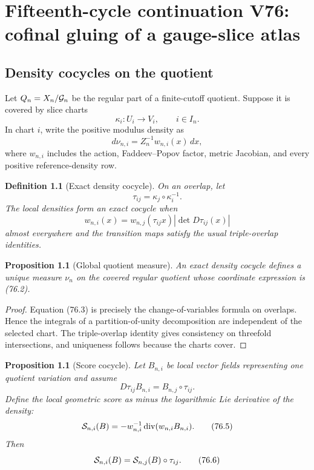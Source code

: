 \documentclass[11pt]{article}
\newtheorem{proposition}[theorem]{Proposition}
\newtheorem{definition}[theorem]{Definition}
\theoremstyle{remark}
\begin{document}
\chapter{Fifteenth-cycle continuation V76: cofinal gluing of a gauge-slice atlas}
\label{sec:v15v76}

\section{Density cocycles on the quotient}

Let \(Q_n=X_n/{\cal G}_n\) be the regular part of a finite-cutoff
quotient.  Suppose it is covered by slice charts
\[
 \kappa_i:U_i\longrightarrow V_i,\qquad i\in I_n.     \tag{76.1}
\]
In chart \(i\), write the positive modulus density as
\[
 d\nu_{n,i}=Z_n^{-1}w_{n,i}(x)\,dx,                   \tag{76.2}
\]
where \(w_{n,i}\) includes the action, Faddeev--Popov factor, metric
Jacobian, and every positive reference-density row.

\begin{definition}[Exact density cocycle]
\label{def:v15v76-cocycle}
On an overlap, let
\[
 \tau_{ij}=\kappa_j\circ\kappa_i^{-1}.
\]
The local densities form an exact cocycle when
\[
 w_{n,i}(x)
 =
 w_{n,j}(\tau_{ij}x)
 |\det D\tau_{ij}(x)|                                 \tag{76.3}
\]
almost everywhere and the transition maps satisfy the usual
triple-overlap identities.
\end{definition}

\begin{proposition}[Global quotient measure]
\label{prop:v15v76-global-measure}
An exact density cocycle defines a unique measure \(\nu_n\) on the
covered regular quotient whose coordinate expression is (76.2).
\end{proposition}

\begin{proof}
Equation (76.3) is precisely the change-of-variables formula on
overlaps.  Hence the integrals of a partition-of-unity
decomposition are independent of the selected chart.  The
triple-overlap identity gives consistency on threefold
intersections, and uniqueness follows because the charts cover.
\end{proof}

\begin{proposition}[Score cocycle]
\label{prop:v15v76-score-cocycle}
Let \(B_{n,i}\) be local vector fields representing one quotient
variation and assume
\[
 D\tau_{ij}B_{n,i}=B_{n,j}\circ\tau_{ij}.              \tag{76.4}
\]
Define the local geometric score as minus the logarithmic Lie
derivative of the density:
\[
 {\cal S}_{n,i}(B)
 =
 -w_{n,i}^{-1}\operatorname{div}(w_{n,i}B_{n,i}).      \tag{76.5}
\]
Then
\[
 {\cal S}_{n,i}(B)
 =
 {\cal S}_{n,j}(B)\circ\tau_{ij}.                     \tag{76.6}
\]
\end{proposition}
\end{document}
